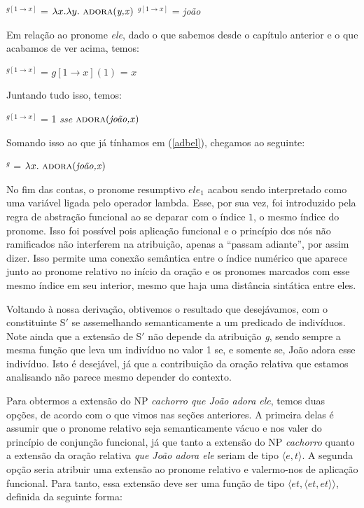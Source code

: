 \begin{exe}
	\ex 
	\begin{xlist}
		\ex {}$^{g[1 \rightarrow x]}$ = $\lambda x.\lambda y.\ \predica{adora}{y,x}$
		\ex {}$^{g[1 \rightarrow x]}$ = \textit{joão}
	\end{xlist}
\end{exe}

\n Em relação ao pronome \textit{ele}, dado o que sabemos desde o capítulo anterior e o que acabamos de ver acima, temos:

\begin{exe}
	\ex {}$^{g[1 \rightarrow x]}$ = $g[1 \rightarrow x](1)$ = $x$ 
\end{exe}

\n Juntando tudo isso, temos:

\begin{exe}
	\ex {}$^{g[1 \rightarrow x]}$ = 1 \textit{sse} $\text{\textsc{adora}(\textit{joão,x})}$
\end{exe}

\n Somando isso ao que já tínhamos em (\ref{adbel}), chegamos ao seguinte:

\begin{exe}
	\ex {}$^{g}$ = $\lambda x.\ \predica{adora}{joão,x}$
\end{exe}

\n No fim das contas, o pronome resumptivo $ele_{1}$ acabou sendo interpretado como uma variável ligada pelo operador lambda. Esse, por sua vez, foi introduzido pela regra de abstração funcional ao se deparar com o índice $1$, o mesmo índice do pronome. Isso foi possível pois aplicação funcional e o princípio dos nós não ramificados não interferem na atribuição, apenas a ``passam adiante'', por assim dizer. Isso permite uma conexão semântica entre o índice numérico que aparece junto ao pronome relativo no início da oração e os pronomes marcados com esse mesmo índice em seu interior, mesmo que haja uma distância sintática entre eles.

Voltando à nossa derivação, obtivemos o resultado que desejávamos, com o constituinte S$'$ se assemelhando semanticamente a um predicado de indivíduos. Note ainda que a
extensão de S$'$ não depende da atribuição \textit{g}, sendo
sempre a mesma função que leva um indivíduo no valor 1 se, e
somente se, João adora esse indivíduo. Isto é desejável, já que
a contribuição da oração relativa que estamos analisando não
parece mesmo depender do contexto.

Para obtermos a extensão do NP \textit{cachorro que João adora ele},
temos duas opções, de acordo com o que vimos nas seções anteriores. A primeira delas é assumir que o pronome relativo seja
semanticamente vácuo e nos valer do princípio de conjunção
funcional, já que tanto a extensão
do NP \textit{cachorro} quanto a extensão da oração relativa
\textit{que João adora ele} seriam de tipo $\langle e,t\rangle$. A segunda opção seria atribuir uma extensão ao pronome relativo e
valermo-nos de aplicação funcional. Para tanto, essa
extensão deve ser uma função de tipo $\langle et,\langle et,
et\rangle\rangle$, definida da seguinte forma:

